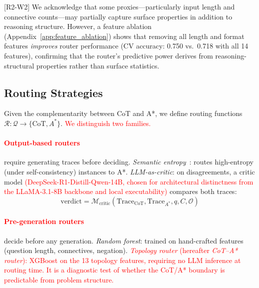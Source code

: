 \documentclass[11pt]{article}
\begin{document}
\textcolor{reviewerblue}{[R2-W2] We acknowledge that some proxies---particularly input length and connective counts---may partially capture surface properties in addition to reasoning structure. However, a feature ablation (Appendix~\ref{app:feature_ablation}) shows that removing all length and format features \emph{improves} router performance (CV accuracy: 0.750 vs.\ 0.718 with all 14 features), confirming that the router's predictive power derives from reasoning-structural properties rather than surface statistics.}

\subsection{Routing Strategies}
\label{sec:routing}

Given the complementarity between CoT and A*, we define routing functions $\mathcal{R}: \mathcal{Q} \to \{\text{CoT}, A^*\}$. \textcolor{red}{We distinguish two families.}

\textcolor{red}{\paragraph{Output-based routers}} require generating traces before deciding. \emph{Semantic entropy}~\citep{kossen2024semanticentropyprobesrobust}: routes high-entropy (under self-consistency) instances to A*. \emph{LLM-as-critic}: on disagreements, a critic model \textcolor{red}{(DeepSeek-R1-Distill-Qwen-14B, chosen for architectural distinctness from the LLaMA-3.1-8B backbone and local executability)} compares both traces:
\begin{equation}
\text{verdict} = \mathcal{M}_{\text{critic}}(\text{Trace}_{\text{CoT}}, \text{Trace}_{A^*}, q, C, \mathcal{O})
\label{eq:critic}
\end{equation}

\textcolor{red}{\paragraph{Pre-generation routers}} decide before any generation. \emph{Random forest}: trained on hand-crafted features (question length, connectives, negation). \textcolor{red}{\emph{Topology router} (hereafter \emph{CoT--A* router}): XGBoost on the 13 topology features, requiring no LLM inference at routing time. It is a diagnostic test of whether the CoT/A* boundary is predictable from problem structure.}
\end{document}
